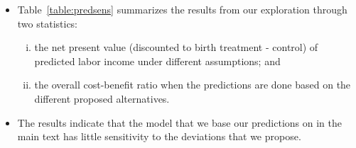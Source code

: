 \documentclass[static]{JJH-Beamer}
\begin{document}
\begin{frame}

\begin{itemize}
\item Table~\ref{table:predsens} summarizes the results from our exploration through two statistics:
    \begin{enumerate}[(i)]
    \item the net present value (discounted to birth treatment - control) of predicted labor income under different assumptions; and
    \item the overall cost-benefit ratio when the predictions are done based on the different proposed alternatives.
    \end{enumerate}
\item The results indicate that the model that we base our predictions on in the main text has little sensitivity to the deviations that we propose.
\end{itemize}

\end{frame}
\end{document}
